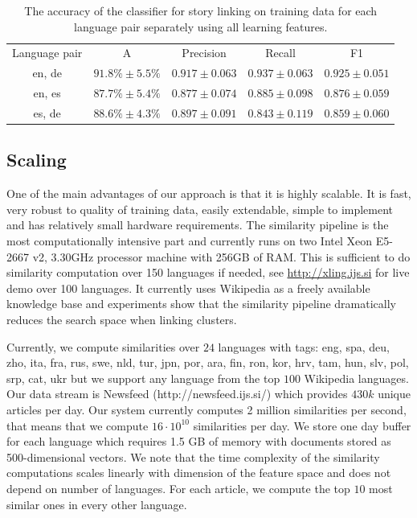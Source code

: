 \documentclass[twoside,11pt]{article}
\begin{document}
\begin{table}[h]
\caption{The accuracy of the classifier for story linking on training data for each language pair separately using all learning features.}
\label{table:langPairEval}
\begin{center}
\begin{tabular}{|c|c|c|c|c|}
  \hline
  \cline{1-5}
  Language pair & A & Precision & Recall & F1 \\ \cline{1-5}
  en, de & $91.8\% \pm 5.5\%$ & $0.917 \pm 0.063$ & $0.937 \pm 0.063$ & $0.925 \pm 0.051$ \\ \cline{1-5}
  en, es & $87.7\% \pm 5.4\%$ & $0.877 \pm 0.074$ & $0.885 \pm 0.098$ & $0.876 \pm 0.059$ \\ \cline{1-5}
  es, de & $88.6\% \pm 4.3\%$ & $0.897 \pm 0.091$ & $0.843 \pm 0.119$ & $0.859 \pm 0.060$ \\ \cline{1-5}
  \hline
\end{tabular}
\end{center}
\end{table}

\subsection{Scaling}

One of the main advantages of our approach is that it is highly scalable. It is fast, very robust to quality of training data, easily extendable, simple to implement and has relatively small hardware requirements. The similarity pipeline is the most computationally intensive part and currently runs on two Intel Xeon E5-2667 v2, 3.30GHz processor machine with 256GB of RAM. This is sufficient to do similarity computation over 150 languages if needed, see \url{http://xling.ijs.si} for live demo over 100 languages. It currently uses Wikipedia as a freely available knowledge base and experiments show that the similarity pipeline dramatically reduces the search space when linking clusters.

Currently, we compute similarities over $24$ languages with tags: eng, spa, deu, zho, ita, fra, rus, swe, nld, tur, jpn, por, ara, fin, ron, kor, hrv, tam, hun, slv, pol, srp, cat, ukr but we support any language from the top $100$ Wikipedia languages. Our data stream is Newsfeed (http://newsfeed.ijs.si/) which provides $430k$ unique articles per day. Our system currently computes 2 million similarities per second, that means that we compute $16 \cdot 10^{10}$ similarities per day. We
store one day buffer for each language which requires 1.5 GB of memory with documents   stored as 500-dimensional vectors. We  note that the time complexity of the similarity computations scales linearly with dimension of the feature space and does not  depend on number of languages. For each article, we compute the top $10$  most similar ones in every other language.
\end{document}
